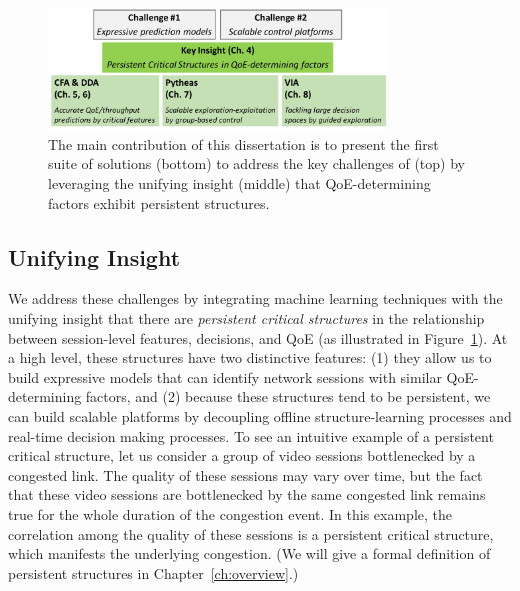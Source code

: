 \begin{figure}[t!]
\centering
\includegraphics[width=0.8\textwidth]{figures/intro-contribution.pdf}
\caption{The main contribution of this dissertation is to present the first suite of 
solutions (bottom) to address the key challenges of \ddn (top) by leveraging the 
unifying insight (middle) that QoE-determining factors exhibit persistent structures.}
\label{fig:intro-contribution}
\end{figure}


\subsection{Unifying Insight}
We address these challenges by integrating 
machine learning techniques with
the unifying insight that there are {\em persistent critical structures} in the relationship
between session-level features, decisions, and QoE 
(as illustrated in Figure~\ref{fig:intro-contribution}).
At a high level, these structures have two distinctive features:
(1) they allow us to build expressive models that can identify network 
sessions with similar QoE-determining factors, and 
(2) because these structures tend to be persistent, we can 
build scalable platforms by decoupling offline structure-learning 
processes and real-time decision making processes.
To see an intuitive example of a persistent critical structure, let us consider 
a group of video sessions bottlenecked by a congested link.
The quality of these sessions may vary over time, but the fact
that these video sessions are bottlenecked by the same congested link remains true 
for the whole duration of the congestion event.
In this example, the correlation among the quality of these sessions 
is a persistent critical structure, which manifests the underlying congestion.
(We will give a formal definition of persistent structures in
Chapter~\ref{ch:overview}.)


